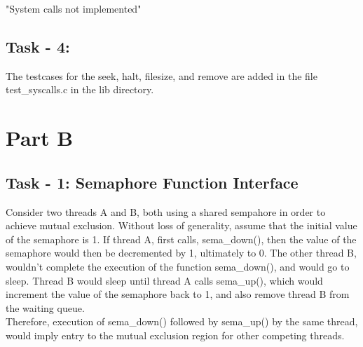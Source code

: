 \documentclass[12pt]{article}
\begin{document}
"System calls not implemented"\\

\subsection*{Task - 4:}

The testcases for the seek, halt, filesize, and remove are added in the file test\_syscalls.c in the lib directory.

\section*{Part B}

\subsection*{Task - 1: Semaphore Function Interface}

Consider two threads A and B, both using a shared sempahore in order 
to achieve mutual exclusion. Without loss of generality, assume that 
the initial value of the semaphore is 1. If thread A, first calls, 
sema\_down(), then the value of the semaphore would then be 
decremented by 1, ultimately to 0. The other thread B, wouldn't 
complete the execution of the function sema\_down(), and would go 
to sleep. Thread B would sleep until thread A calls sema\_up(), which
would increment the value of the semaphore back to 1, and also remove
thread B from the waiting queue. \\

\noindent
Therefore, execution of sema\_down() followed by sema\_up() by the
same thread, would imply entry to the mutual exclusion region for other
competing threads.
\end{document}
